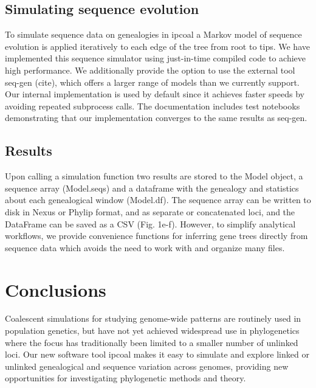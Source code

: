 \documentclass[11pt]{article}
\begin{document}
\subsection{Simulating sequence evolution}
To simulate sequence data on genealogies in ipcoal a Markov model of sequence evolution is applied iteratively to each edge of the tree from root to tips. We have implemented this sequence simulator using just-in-time compiled code to achieve high performance. We additionally provide the option to use the external tool seq-gen (cite), which offers a larger range of models than we currently support. Our internal implementation is used by default since it achieves faster speeds by avoiding repeated subprocess calls. The documentation includes test notebooks demonstrating that our implementation converges to the same results as seq-gen.

\subsection{Results}
Upon calling a simulation function two results are stored to the Model object, a sequence array (Model.seqs) and a dataframe with the genealogy and statistics about each genealogical window (Model.df). The sequence array can be written to disk in Nexus or Phylip format, and as separate or concatenated loci, and the DataFrame can be saved as a CSV (Fig. 1e-f). However, to simplify analytical workflows, we provide convenience functions for inferring gene trees directly from sequence data which avoids the need to work with and organize many files.

\section{Conclusions}
\label{sec:conclusions}
Coalescent simulations for studying genome-wide patterns are routinely used in population genetics, but have not yet achieved widespread use in phylogenetics where the focus has traditionally been limited to a smaller number of unlinked loci. Our new software tool ipcoal makes it easy to simulate and explore linked or unlinked genealogical and sequence variation across genomes, providing new opportunities for investigating phylogenetic methods and theory.
\end{document}
